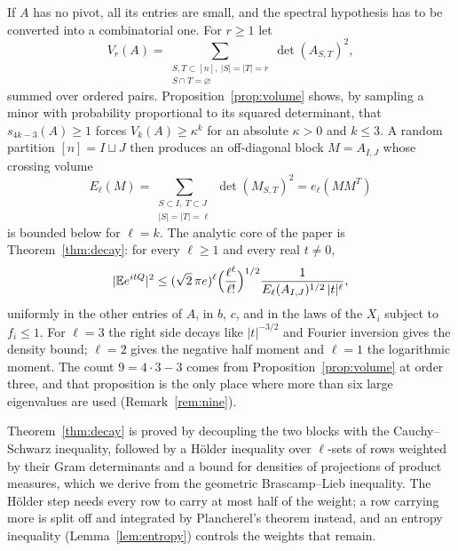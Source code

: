 \documentclass[11pt]{amsart}
\numberwithin{equation}{section}
\theoremstyle{definition}
\theoremstyle{remark}
\newcommand{\E}{\mathbb E}
\newcommand{\1}{\mathbf 1}
\newcommand{\abs}[1]{\lvert #1\rvert}
\begin{document}
If $A$ has no pivot, all its entries are small, and the spectral hypothesis has to be converted into a combinatorial one. For $r\ge1$ let
\[
V_r(A)=\sum_{\substack{S,T\subset[n],\ \abs S=\abs T=r\\ S\cap T=\varnothing}}\det(A_{S,T})^2,
\]
summed over ordered pairs. Proposition~\ref{prop:volume} shows, by sampling a minor with probability proportional to its squared determinant, that $s_{4k-3}(A)\ge1$ forces $V_k(A)\ge\kappa^k$ for an absolute $\kappa>0$ and $k\le3$. A random partition $[n]=I\sqcup J$ then produces an off-diagonal block $M=A_{I,J}$ whose crossing volume
\[
E_\ell(M)=\sum_{\substack{S\subset I,\ T\subset J\\ \abs S=\abs T=\ell}}\det(M_{S,T})^2=e_\ell(MM^T)
\]
is bounded below for $\ell=k$. The analytic core of the paper is Theorem~\ref{thm:decay}: for every $\ell\ge1$ and every real $t\ne0$,
\[
\abs{\E e^{itQ}}^2\le(\sqrt2\,\pi e)^\ell\Bigl(\frac{\ell^\ell}{\ell!}\Bigr)^{1/2}\frac{1}{E_\ell(A_{I,J})^{1/2}\,\abs t^{\ell}},
\]
uniformly in the other entries of $A$, in $b$, $c$, and in the laws of the $X_i$ subject to $f_i\le1$. For $\ell=3$ the right side decays like $\abs t^{-3/2}$ and Fourier inversion gives the density bound; $\ell=2$ gives the negative half moment and $\ell=1$ the logarithmic moment. The count $9=4\cdot3-3$ comes from Proposition~\ref{prop:volume} at order three, and that proposition is the only place where more than six large eigenvalues are used (Remark~\ref{rem:nine}).

Theorem~\ref{thm:decay} is proved by decoupling the two blocks with the Cauchy--Schwarz inequality, followed by a H\"older inequality over $\ell$-sets of rows weighted by their Gram determinants and a bound for densities of projections of product measures, which we derive from the geometric Brascamp--Lieb inequality. The H\"older step needs every row to carry at most half of the weight; a row carrying more is split off and integrated by Plancherel's theorem instead, and an entropy inequality (Lemma~\ref{lem:entropy}) controls the weights that remain.
\end{document}
